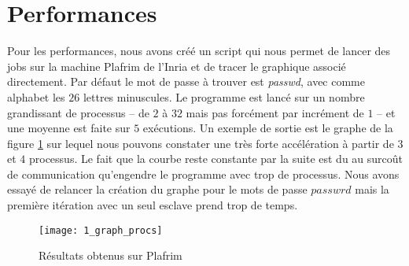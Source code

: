 \section{Performances} %
\label{sec:perf}

Pour les performances, nous avons créé un script qui nous permet de lancer des jobs sur la machine Plafrim de l'Inria et de tracer le graphique associé directement. Par défaut le mot de passe à trouver est \emph{passwd}, avec comme alphabet les $26$ lettres minuscules. Le programme est lancé sur un nombre grandissant de processus -- de $2$ à $32$ mais pas forcément par incrément de $1$ -- et une moyenne est faite sur $5$ exécutions. Un exemple de sortie est le graphe de la figure \ref{fig:graph_procs} sur lequel nous pouvons constater une très forte accélération à partir de $3$  et $4$ processus. Le fait que la courbe reste constante par la suite est du au surcoût de communication qu'engendre le programme avec trop de processus. Nous avons essayé de relancer la création du graphe pour le mots de passe $passwrd$ mais la première itération avec un seul esclave prend trop de temps.

\begin{figure}[h!]
\centering
\texttt{[image: 1\_graph\_procs]}
\caption{Résultats obtenus sur Plafrim}
\label{fig:graph_procs}
\end{figure}

